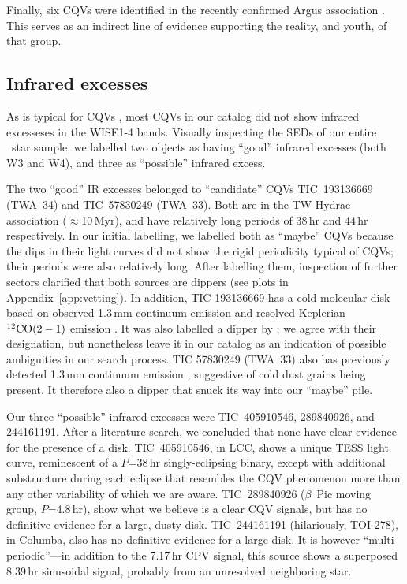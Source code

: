 \documentclass[11pt,twocolumn,tighten]{aastex63}
\begin{document}
Finally, six CQVs were identified in the recently confirmed Argus
association \citep{2019ApJ...870...27Z}.  This serves as an indirect
line of evidence supporting the reality, and youth, of that group.


\subsection{Infrared excesses}
\label{subsec:irexcess}

As is typical for CQVs \citep{2017AJ....153..152S}, most CQVs in our
catalog did not show infrared excesseses in the WISE1-4 bands.
Visually inspecting the SEDs of our entire \ncpvsfound\ star sample,
we labelled two objects as having ``good'' infrared excesses (both W3
and W4), and three as ``possible'' infrared excess.

The two ``good'' IR excesses belonged to ``candidate'' CQVs
TIC~193136669 (TWA~34) and TIC~57830249 (TWA~33).  Both are in the TW
Hydrae association ($\approx$10\,Myr), and have relatively long
periods of 38\,hr and 44\,hr respectively.  In our initial labelling,
we labelled both as ``maybe'' CQVs because the dips in their light
curves did not show the rigid periodicity typical of CQVs;  their
periods were also relatively long.  After labelling them, inspection
of further sectors clarified that both sources are dippers (see plots
in Appendix~\ref{app:vetting}).  In addition, TIC 193136669 has a cold
molecular disk based on observed 1.3\,mm continuum emission and
resolved Keplerian $^{12}{\rm CO}(2-1)$ emission
\citep{2015A&A...582L...5R}.  It was also labelled a dipper by
\citet{2022ApJS..263...14C}; we agree with their designation, but
nonetheless leave it in our catalog as an indication of possible
ambiguities in our search process.  TIC 57830249 (TWA~33) also has
previously detected 1.3\,mm continuum emission
\citep{2015A&A...582L...5R}, suggestive of cold dust grains being
present.  It therefore also a dipper that snuck its way into our
``maybe'' pile.

Our three ``possible'' infrared excesses were TIC~405910546,
289840926, and 244161191.  After a literature search, we concluded
that none have clear evidence for the presence of a disk.
TIC~405910546, in LCC, shows a unique TESS light curve, reminescent of
a $P$=38\,hr singly-eclipsing binary, except with additional
substructure during each eclipse that resembles the CQV phenomenon
more than any other variability of which we are aware.  TIC~289840926
($\beta$~Pic moving group, $P$=4.8\,hr), show what we believe is a
clear CQV signals, but has no definitive evidence for a large, dusty
disk.  TIC~244161191 (hilariously, TOI-278), in Columba, also has no
definitive evidence for a large disk.  It is however
``multi-periodic''---in addition to the 7.17\,hr CPV signal, this
source shows a superposed 8.39\,hr sinusoidal signal, probably from an
unresolved neighboring star.
\end{document}
